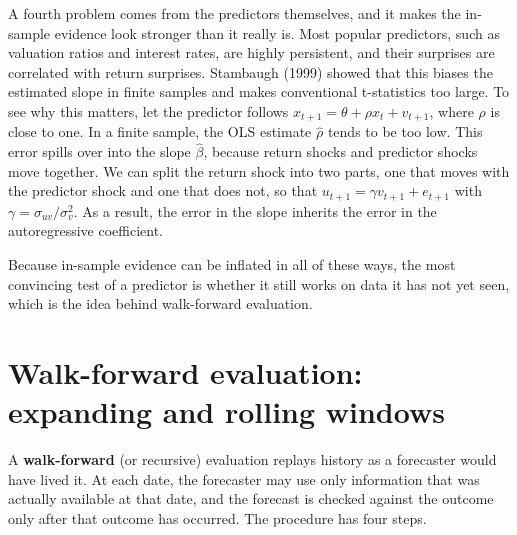  
A fourth problem comes from the predictors themselves, and it makes the in-sample evidence look stronger than it really is.
Most popular predictors, such as valuation ratios and interest rates, are highly persistent, and their surprises are correlated with return surprises. Stambaugh (1999) showed that this biases the estimated slope in finite samples and makes conventional t-statistics too large. 
To see why this matters, let the predictor follows $x_{t+1} = \theta + \rho x_t + v_{t+1}$, where $\rho$ is close to one. In a finite sample, the OLS estimate $\hat{\rho}$ tends to be too low. This error spills over into the slope $\hat{\beta}$, because return shocks and predictor shocks move together. We can split the return shock into two parts, one that moves with the predictor shock and one that does not, so that $u_{t+1} = \gamma v_{t+1} + e_{t+1}$ with $\gamma = \sigma_{uv}/\sigma_v^2$. As a result, the error in the slope inherits the error in the autoregressive coefficient.


Because in-sample evidence can be inflated in all of these ways, the most convincing test of a predictor is whether it still works on data it has not yet seen, which is the idea behind walk-forward evaluation.

\section{Walk-forward evaluation: expanding and rolling windows}
\label{sec:05-walkforward}

A \textbf{walk-forward} (or recursive) evaluation replays history as a forecaster would have lived it. At each date, the forecaster may use only information that was actually available at that date, and the forecast is checked against the outcome only after that outcome has occurred. The procedure has four steps.

